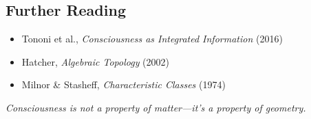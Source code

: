 \subsection{Further Reading}

\begin{itemize}
\item Tononi et al., \textit{Consciousness as Integrated Information} (2016)
\item Hatcher, \textit{Algebraic Topology} (2002)
\item Milnor \& Stasheff, \textit{Characteristic Classes} (1974)
\end{itemize}

\vspace{1cm}

\begin{center}
\textit{Consciousness is not a property of matter—it's a property of geometry.}
\end{center}
